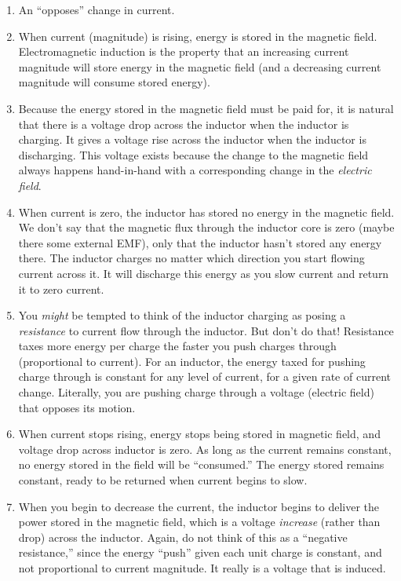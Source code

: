 \documentclass[11pt, oneside]{amsart}
\begin{document}
\begin{enumerate}

  \item An  ``opposes'' change in current.

  \item When current (magnitude) is rising, energy is stored in the
  magnetic field. Electromagnetic induction is the property that an
  increasing current magnitude will store energy in the magnetic field
  (and a decreasing current magnitude will consume stored energy).

  \item Because the energy stored in the magnetic field must be paid
  for, it is natural that there is a voltage drop across the inductor
  when the inductor is charging. It gives a voltage rise across the
  inductor when the inductor is discharging. This voltage exists because
  the change to the magnetic field always happens hand-in-hand with a
  corresponding change in the \emph{electric field}.

  \item When current is zero, the inductor has stored no energy in the
  magnetic field. We don't say that the magnetic flux through the
  inductor core is zero (maybe there some external EMF), only that the
  inductor hasn't stored any energy there. The inductor charges no
  matter which direction you start flowing current across it. It will
  discharge this energy as you slow current and return it to zero
  current.

  \item You \emph{might} be tempted to think of the inductor charging as
  posing a \emph{resistance} to current flow through the inductor. But
  don't do that! Resistance taxes more energy per charge the faster you
  push charges through (proportional to current). For an inductor, the
  energy taxed for pushing charge through is constant for any level of
  current, for a given rate of current change. Literally, you are
  pushing charge through a voltage (electric field) that opposes its
  motion.

  \item When current stops rising, energy stops being stored in magnetic
  field, and voltage drop across inductor is zero. As long as the
  current remains constant, no energy stored in the field will be
  ``consumed.'' The energy stored remains constant, ready to be returned
  when current begins to slow.

  \item When you begin to decrease the current, the inductor begins to
  deliver the power stored in the magnetic field, which is a voltage
  \emph{increase} (rather than drop) across the inductor. Again, do not
  think of this as a ``negative resistance,'' since the energy ``push''
  given each unit charge is constant, and not proportional to current
  magnitude. It really is a voltage that is induced.


\end{enumerate}
\end{document}
